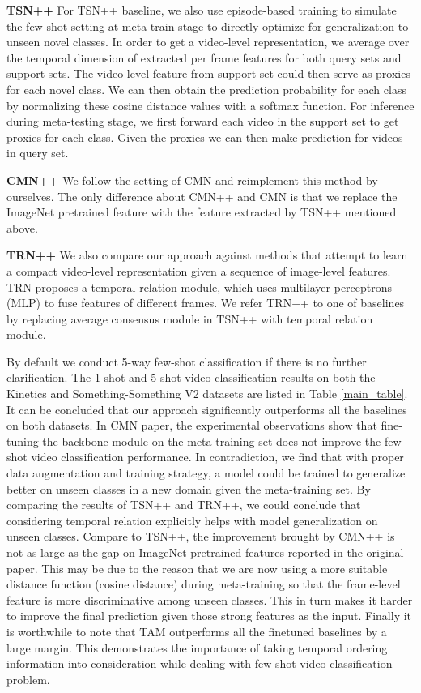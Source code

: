 \documentclass[10pt,twocolumn,letterpaper]{article}
\begin{document}
\noindent
\textbf{TSN++} For TSN++ baseline, we also use episode-based training to simulate the few-shot setting at meta-train stage to directly optimize for generalization to unseen novel classes. In order to get a video-level representation, we average over the temporal dimension of extracted per frame features for both query sets and support sets. The video level feature from support set could then serve as proxies for each novel class. We can then obtain the prediction probability for each class by normalizing these cosine distance values with a softmax function. For inference during meta-testing stage, we first forward each video in the support set to get proxies for each class. Given the proxies we can then make prediction for videos in query set.
 
\noindent
\textbf{CMN++} We follow the setting of CMN and reimplement this method by ourselves. The only difference about CMN++ and CMN is that we replace the ImageNet pretrained feature with the feature extracted by TSN++ mentioned above. 

\noindent
\textbf{TRN++} We also compare our approach against methods that attempt to learn a compact video-level representation given a sequence of image-level features. TRN \cite{zhou2018temporal} proposes a temporal relation module, which uses multilayer perceptrons (MLP) to fuse features of different frames. We refer TRN++ to one of baselines by replacing average consensus module in TSN++ with temporal relation module.

By default we conduct 5-way few-shot classification if there is no further clarification. The 1-shot and 5-shot video classification results on both the Kinetics and Something-Something V2 datasets are listed in Table \ref{main_table}. It can be concluded that our approach significantly outperforms all the baselines on both datasets. In CMN paper, the experimental observations show that fine-tuning the backbone module on the meta-training set does not improve the few-shot video classification performance. In contradiction, we find that with proper data augmentation and training strategy, a model could be trained to generalize better on unseen classes in a new domain given the meta-training set. By comparing the results of TSN++ and TRN++, we could conclude that considering temporal relation explicitly helps with model generalization on unseen classes. Compare to TSN++, the improvement brought by CMN++ is not as large as the gap on ImageNet pretrained features reported in the original paper. This may be due to the reason that we are now using a more suitable distance function (cosine distance) during meta-training so that the frame-level feature is more discriminative among unseen classes. This in turn makes it harder to improve the final prediction given those strong features as the input. Finally it is worthwhile to note that TAM outperforms all the finetuned baselines by a large margin. This demonstrates the importance of taking temporal ordering information into consideration while dealing with few-shot video classification problem.
\end{document}
